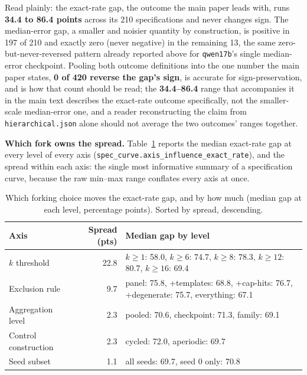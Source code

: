 \documentclass[11pt]{article}
\begin{document}
Read plainly: the exact-rate gap, the outcome the main paper leads with,
runs \textbf{34.4 to 86.4 points} across its 210 specifications and never
changes sign. The median-error gap, a smaller and noisier quantity by
construction, is positive in 197 of 210 and exactly zero (never negative) in
the remaining 13, the same zero-but-never-reversed pattern already reported
above for \texttt{qwen17b}'s single median-error checkpoint. Pooling both
outcome definitions into the one
number the main paper states, \textbf{0 of 420 reverse the gap's sign},
is accurate for sign-preservation, and is how that count should be read; the
\textbf{34.4--86.4} range that accompanies it in the main text describes the
exact-rate outcome specifically, not the smaller-scale median-error one, and a
reader reconstructing the claim from \texttt{hierarchical.json} alone should
not average the two outcomes' ranges together.

\noindent\textbf{Which fork owns the spread.} Table~\ref{tab:hier-axis} reports
the median exact-rate gap at every level of every axis
(\texttt{spec\_curve.axis\_influence\_exact\_rate}), and the spread within each
axis: the single most informative summary of a specification curve, because
the raw min--max range conflates every axis at once.

\begin{table}[h]
\centering
\caption{Which forking choice moves the exact-rate gap, and by how much
(median gap at each level, percentage points). Sorted by spread, descending.}
\label{tab:hier-axis}
\small
\begin{tabular}{@{}l r p{6.6cm}@{}}
\toprule
Axis & Spread (pts) & Median gap by level \\
\midrule
$k$ threshold & 22.8 & $k{\ge}1$: 58.0, $k{\ge}6$: 74.7, $k{\ge}8$: 78.3, $k{\ge}12$: 80.7, $k{\ge}16$: 69.4 \\
Exclusion rule & 9.7 & panel: 75.8, +templates: 68.8, +cap-hits: 76.7, +degenerate: 75.7, everything: 67.1 \\
Aggregation level & 2.3 & pooled: 70.6, checkpoint: 71.3, family: 69.1 \\
Control construction & 2.3 & cycled: 72.0, aperiodic: 69.7 \\
Seed subset & 1.1 & all seeds: 69.7, seed 0 only: 70.8 \\
\bottomrule
\end{tabular}
\end{table}
\end{document}
